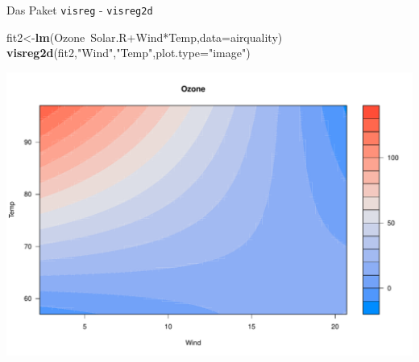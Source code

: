 \documentclass[ignorenonframetext,]{beamer}
\newenvironment{Shaded}{}{}
\newcommand{\KeywordTok}[1]{\textcolor[rgb]{0.00,0.44,0.13}{\textbf{{#1}}}}
\newcommand{\DataTypeTok}[1]{\textcolor[rgb]{0.56,0.13,0.00}{{#1}}}
\newcommand{\StringTok}[1]{\textcolor[rgb]{0.25,0.44,0.63}{{#1}}}
\newcommand{\NormalTok}[1]{{#1}}
\begin{document}
\begin{frame}[fragile]{Das Paket \texttt{visreg} - \texttt{visreg2d}}

\begin{Shaded}
\begin{Highlighting}[]
\NormalTok{fit2<-}\KeywordTok{lm}\NormalTok{(Ozone~Solar.R+Wind*Temp,}\DataTypeTok{data=}\NormalTok{airquality)}
\KeywordTok{visreg2d}\NormalTok{(fit2,}\StringTok{"Wind"}\NormalTok{,}\StringTok{"Temp"}\NormalTok{,}\DataTypeTok{plot.type=}\StringTok{"image"}\NormalTok{)}
\end{Highlighting}
\end{Shaded}

\includegraphics{R_intern_files/figure-beamer/unnamed-chunk-318-1.pdf}

\end{frame}
\end{document}

